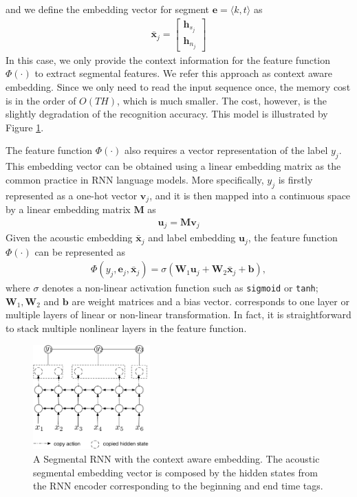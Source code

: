 \documentclass[a4paper]{article}
\begin{document}
and we define the embedding vector for segment ${\bm e} = \langle k, t\rangle$ as
\begin{align}
\bar{\bm x}_j =
\left [ \begin{array}{c}
{\bm h}_{s_j}  \\
{\bm h}_{n_j}   
\end{array} \right]
\end{align}
In this case, we only provide the context information for the feature function $\Phi(\cdot)$ to extract segmental features. We refer this approach as context aware embedding. Since we only need to read the input sequence once, the memory cost is in the order of $O(TH)$, which is much smaller. The cost, however, is the slightly degradation of the recognition accuracy. This model is illustrated by Figure \ref{fig:srnn}.
 
The feature function $\Phi(\cdot)$ also requires a vector representation of the label $y_j$. This embedding vector can be obtained using a linear embedding matrix as the common practice in RNN language models. More specifically, $y_j$ is firstly represented as a one-hot vector ${\bm v}_j$, and it is then mapped into a continuous space by a linear embedding matrix ${\bm M}$ as
\begin{eqnarray}
{\bm u}_j = {\bm M \bm v}_j
\end{eqnarray}
Given the acoustic embedding $\bar{\bm x}_j$ and label embedding $\bm u_j$, the feature function $\Phi(\cdot)$ can be represented as 
\begin{align}
\Phi(y_j, {\bm e}_j, \bar{\bm x}_j) = \sigma({\bm W}_1{\bm u}_j + {\bm W}_2\bar{\bm x}_j + \bm b),
\end{align}
where $\sigma$ denotes a non-linear activation function such as {\tt sigmoid} or {\tt tanh}; $\bm W_1, \bm W_2$ and $\bm b$ are weight matrices and a bias vector. corresponds to one layer or multiple layers of linear or non-linear transformation. In fact, it is straightforward to stack multiple nonlinear layers in the feature function.

\begin{figure}[t]
\small
\centerline{\includegraphics[width=0.4\textwidth]{srnn}} \vskip -2mm
\caption{A Segmental RNN with the context aware embedding. The acoustic segmental embedding vector is composed by the hidden states from the RNN encoder corresponding to the beginning and end time tags. }  
\label{fig:srnn}
\vskip -4mm
\end{figure}
\end{document}
